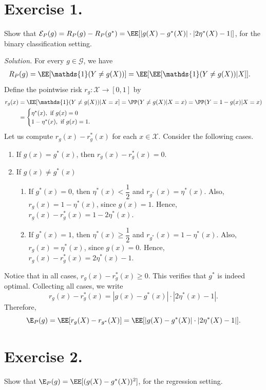\section{Exercise 1.} Show that $\mathcal{E}_P(g) = R_P(g) - R_P(g^*) = \EE[|g(X)-g^*(X)|\cdot|2\eta^*(X)-1|]$, for the binary classification setting.

\textit{Solution.} For every $g\in\mathcal{G}$, we have
\begin{align*}
  R_P(g) & = \EE[\mathds{1}(Y\ne g(X))] = \EE[\EE[\mathds{1}(Y\ne g(X)) | X]].
\end{align*}
Define the pointwise risk $r_g:\mathcal{X}\to [0,1]$ by
\begin{align*}
  r_g(x) & =\EE[\mathds{1}(Y\ne g(X)) | X=x]  = \PP(Y\ne g(X) | X=x) = \PP(Y= 1-g(x)| X=x) \\
         & = \begin{cases}
               \eta^*(x), \text{ if } g(x)=0 \\
               1- \eta^*(x), \text{ if } g(x)=1.
             \end{cases}
\end{align*}
Let us compute $r_g(x) - r_g^*(x)$ for each $x\in\mathcal{X}$. Consider the following cases.
\begin{enumerate}
  \item If $g(x)=g^*(x)$, then $r_g(x) - r_g^*(x)=0$.
  \item If $g(x)\ne g^*(x)$
        \begin{enumerate}
          \item [(a)] If $g^*(x) = 0$, then $\eta^*(x)<\dfrac{1}{2}$ and $r_{g^*}(x)=\eta^*(x)$. Also, $r_g(x)=1-\eta^*(x)$, since $g(x) = 1$. Hence, $r_g(x) - r_g^*(x)=1-2\eta^*(x)$.
          \item [(b)] If $g^*(x) = 1$, then $\eta^*(x)\ge\dfrac{1}{2}$ and $r_{g^*}(x)=1-\eta^*(x)$. Also, $r_g(x)=\eta^*(x)$, since $g(x) = 0$. Hence, $r_g(x) - r_g^*(x)=2\eta^*(x)-1$.
        \end{enumerate}
\end{enumerate}
Notice that in all cases, $r_g(x) - r_g^*(x)\ge 0$. This verifies that $g^*$ is indeed optimal. Collecting all cases, we write
$$r_g(x) - r_g^*(x) = |g(x)-g^*(x)|\cdot|2\eta^*(x)-1|.$$ Therefore,
$$\E_P(g) = \EE[r_g(X)-r_{g^*}(X)] = \EE[|g(X)-g^*(X)|\cdot|2\eta^*(X)-1|].$$

\section{Exercise 2.} Show that $\E_P(g) = \EE[(g(X)-g^*(X))^2]$, for the regression setting.

